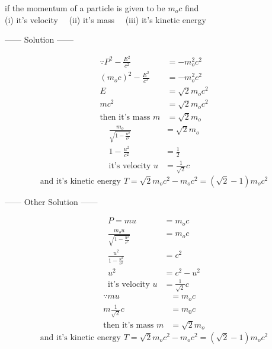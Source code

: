 \documentclass{article}
\begin{document}
\begin{example}
if the momentum of a particle is given to be $m_o c$ find 
\\(i) it's velocity \ \ (ii) it's mass \ \ (iii) it's kinetic energy
\begin{center}
    ------ \textcolor{Solution}{Solution} ------
\end{center}
\begin{align*}
    \because P^2 - \frac{E^2}{c^2} &= -m_o^2 c^2\\
    {(m_o c)}^2 - \frac{E^2}{c^2} &= -m_o^2 c^2\\
    E &= \sqrt{2} m_o c^2\\
    m c^2 &= \sqrt{2} m_o c^2\\
    \text{then it's mass } m &= \sqrt{2} m_o
\end{align*}
\begin{align*}
    \frac{m_o}{\sqrt{1 - \frac{u^2}{c^2}}} &= \sqrt{2} m_o\\
    1 - \frac{u^2}{c^2} &= \frac{1}{2}\\
    \text{it's velocity } u &= \frac{1}{\sqrt{2}} c
\end{align*}
\[
    \text{and it's kinetic energy } T = \sqrt{2} m_o c^2 - m_o c^2 = \left(\sqrt{2} -1\right)m_o c^2
\]
\begin{center}
    ------ \textcolor{Solution}{Other Solution} ------
\end{center}
\begin{align*}
    P = mu &= m_o c\\
    \frac{m_o u}{\sqrt{1 - \frac{u^2}{c^2}}} &= m_o c\\
    \frac{u^2}{1 - \frac{u^2}{c^2}} &= c^2\\
    u^2 &= c^2 - u^2\\
    \text{it's velocity } u &= \frac{1}{\sqrt{2}} c
\end{align*}
\begin{align*}
    \because mu &= m_o c\\
        m \frac{1}{\sqrt{2}} c &= m_0 c\\
        \text{then it's mass } m &= \sqrt{2} m_o
\end{align*}
\[
    \text{and it's kinetic energy } T = \sqrt{2} m_o c^2 - m_o c^2 = \left(\sqrt{2} -1\right)m_o c^2
\]
\end{example}
\end{document}
